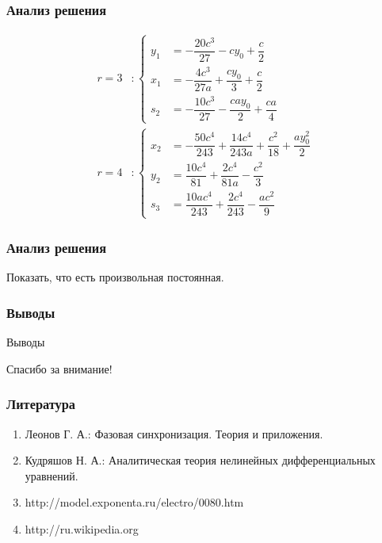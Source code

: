 \documentclass[hyperref={pdftex,unicode}]{beamer}
\begin{document}
\begin{frame}

\frametitle{Анализ решения}

$$
\begin{aligned}
r = 3 &:
\left\{
	\begin{aligned}
		y_1 &= -\dfrac{20c^3}{27} - cy_0 + \dfrac{c}{2} \\
		x_1 &= -\dfrac{4c^3}{27a} + \dfrac{cy_0}{3} + \dfrac{c}{2} \\
		s_2 &= -\dfrac{10c^3}{27} - \dfrac{cay_0}{2} + \dfrac{ca}{4}
	\end{aligned}
\right.
\\
r = 4 &: 
\left\{
	\begin{aligned}
		x_2 &= -\dfrac{50c^4}{243} + \dfrac{14c^4}{243a} + \dfrac{c^2}{18} + \dfrac{ay^2_0}{2}\\
		y_2 &= \dfrac{10c^4}{81} + \dfrac{2c^4}{81a} - \dfrac{c^2}{3} \\
		s_3 &= \dfrac{10ac^4}{243} + \dfrac{2c^4}{243} - \dfrac{ac^2}{9}
	\end{aligned}
\right.
\end{aligned}
$$

\end{frame}



\begin{frame}

\frametitle{Анализ решения}

Показать, что есть произвольная постоянная.

\end{frame}


\begin{frame}

\frametitle{Выводы}

Выводы

\end{frame}


\begin{frame}
\begin{center}

Спасибо за внимание!

\end{center}
\end{frame}


\begin{frame}
\frametitle{Литература}

\begin{enumerate}
\item{Леонов Г. А.: Фазовая синхронизация. Теория и приложения.}
\item{Кудряшов Н. А.: Аналитическая теория нелинейных дифференциальных уравнений.}

\item{http://model.exponenta.ru/electro/0080.htm}
\item{http://ru.wikipedia.org}

\end{enumerate}

\end{frame}
\end{document}
